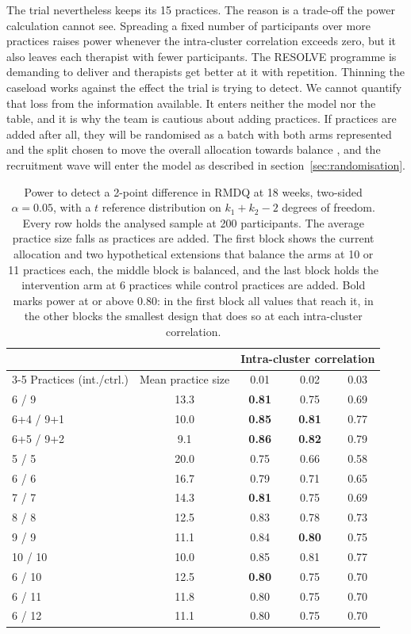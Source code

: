 \documentclass[11pt,a4paper]{article}
\begin{document}
The trial nevertheless keeps its 15 practices. The reason is a
trade-off the power calculation cannot see. Spreading a fixed number of
participants over more practices raises power whenever the intra-cluster
correlation exceeds zero, but it also leaves each therapist with fewer
participants. The RESOLVE programme is demanding to deliver and therapists
get better at it with repetition. Thinning the caseload works against the
effect the trial is trying to detect. We cannot quantify that loss from the
information available. It enters neither the model nor the table, and it
is why the team is cautious about adding practices. If practices are added
after all, they will be randomised as a batch with both arms represented and
the split chosen to move the overall allocation towards balance
\citep{copas2021}, and the recruitment wave will enter the model as described
in section~\ref{sec:randomisation}.

\begin{table}[ht]
\centering\small
\caption{Power to detect a 2-point difference in RMDQ at 18 weeks, two-sided
$\alpha = 0.05$, with a $t$ reference distribution on $k_1+k_2-2$ degrees of
freedom. Every row holds the analysed sample at 200 participants. The
average practice size falls as practices are added. The first block shows
the current allocation and two hypothetical extensions that balance the arms
at 10 or 11 practices each, the middle block is balanced, and the last block
holds the intervention arm at 6 practices while control practices are added. Bold marks
power at or above 0.80: in the first block all values that reach it, in the
other blocks the smallest design that does so at each intra-cluster
correlation.}
\label{tab:power}
\begin{tabular}{lcccc}
\toprule
& & \multicolumn{3}{c}{Intra-cluster correlation}\\
\cmidrule(l){3-5}
Practices (int./ctrl.) & Mean practice size & 0.01 & 0.02 & 0.03\\
\midrule
6 / 9   & 13.3 & \textbf{0.81} & 0.75 & 0.69\\
6+4 / 9+1 & 10.0 & \textbf{0.85} & \textbf{0.81} & 0.77\\
6+5 / 9+2 & 9.1  & \textbf{0.86} & \textbf{0.82} & 0.79\\
\midrule
5 / 5   & 20.0 & 0.75 & 0.66 & 0.58\\
6 / 6   & 16.7 & 0.79 & 0.71 & 0.65\\
7 / 7   & 14.3 & \textbf{0.81} & 0.75 & 0.69\\
8 / 8   & 12.5 & 0.83 & 0.78 & 0.73\\
9 / 9   & 11.1 & 0.84 & \textbf{0.80} & 0.75\\
10 / 10 & 10.0 & 0.85 & 0.81 & 0.77\\
\midrule
6 / 10  & 12.5 & \textbf{0.80} & 0.75 & 0.70\\
6 / 11  & 11.8 & 0.80 & 0.75 & 0.70\\
6 / 12  & 11.1 & 0.80 & 0.75 & 0.70\\
\bottomrule
\end{tabular}
\end{table}
\end{document}
